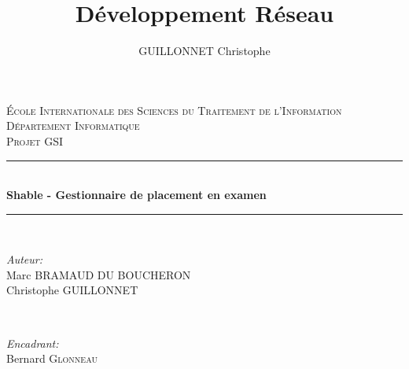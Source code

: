 \documentclass[11pt,a4paper, openany]{book}
\author{GUILLONNET Christophe}
\title{Développement Réseau}
\begin{document}
\begin{titlepage}

\newcommand{\HRule}{\rule{\linewidth}{0.5mm}} %

\center %
 

\textsc{\LARGE École Internationale des Sciences du Traitement de l'Information}\\[1.5cm] %
\textsc{\Large Département Informatique}\\[0.5cm] %
\textsc{\large Projet GSI}\\[0.5cm] %


\HRule \\[0.4cm]
{ \huge \bfseries Shable - Gestionnaire de placement en examen}\\[0.4cm] %
\HRule \\[1.5cm]
 

\begin{minipage}{0.4\textwidth}
\begin{flushleft} \large
\emph{Auteur:}\\
Marc \textsc{BRAMAUD DU BOUCHERON}\\ %
Christophe \textsc{GUILLONNET}\\ %
\end{flushleft}
\end{minipage}
~
\begin{minipage}{0.4\textwidth}
\begin{flushright} \large
\emph{Encadrant:} \\
Bernard \textsc{Glonneau} %
\end{flushright}
\end{minipage}\\[4cm]


\end{titlepage}
\end{document}
